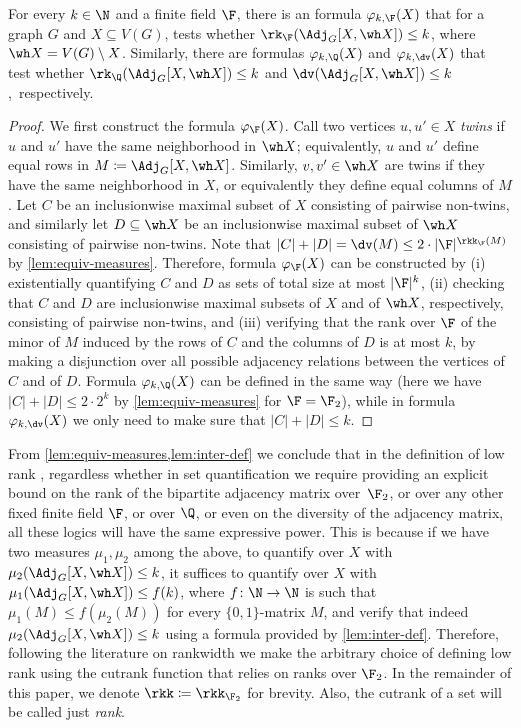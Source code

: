 \begin{lemma}\label{lem:inter-def}
 For every $k\in \N$ and a finite field $\F$, there is an \fo formula $\varphi_{k,\F}(X)$ that for a graph $G$ and $X\subseteq V(G)$, tests whether $\rk_\F(\Adj_G[X,\wh X])\leq k$, where $\wh X=V(G)\setminus X$. Similarly, there are formulas $\varphi_{k,\Q}(X)$ and $\varphi_{k,\dv}(X)$ that test whether $\rk_\Q(\Adj_G[X,\wh X])\leq k$ and $\dv(\Adj_G[X,\wh X])\leq k$,~respectively.
\end{lemma}
\begin{proof}
 We first construct the formula $\varphi_\F(X)$. Call two vertices $u,u'\in X$ {\em{twins}} if $u$ and $u'$ have the same neighborhood in $\wh X$; equivalently, $u$ and $u'$ define equal rows in $M\coloneqq \Adj_G[X,\wh X]$. Similarly, $v,v'\in \wh X$ are twins if they have the same neighborhood in $X$, or equivalently they define equal columns of $M$. Let $C$ be an inclusionwise maximal subset of $X$ consisting of pairwise non-twins, and similarly let $D\subseteq \wh X$ be an inclusionwise maximal subset of $\wh X$ consisting of pairwise non-twins. Note that $|C|+|D|=\dv(M)\leq 2 \cdot |\F|^{\rkk_\F(M)}$ by \cref{lem:equiv-measures}. Therefore, formula $\varphi_\F(X)$ can be constructed by (i) existentially quantifying $C$ and $D$ as sets of total size at most $|\F|^k$, (ii) checking that $C$ and $D$ are inclusionwise maximal subsets of $X$ and of $\wh X$, respectively, consisting of pairwise non-twins, and (iii) verifying that the rank over $\F$ of the minor of $M$ induced by the rows of $C$ and the columns of $D$ is at most $k$, by making a disjunction over all possible adjacency relations between the vertices of $C$ and of $D$. Formula $\varphi_{k,\Q}(X)$ can be defined in the same way (here we have $|C|+|D|\leq 2\cdot 2^k$ by \cref{lem:equiv-measures} for $\F=\F_2$), while in formula $\varphi_{k,\dv}(X)$ we only need to make sure that $|C|+|D|\leq k$.
\end{proof}

From \cref{lem:equiv-measures,lem:inter-def} we conclude that in the definition of low rank \mso, regardless whether in set quantification we require providing an explicit bound on the rank of the bipartite adjacency matrix over~$\F_2$, or over any other fixed finite field $\F$, or over $\Q$, or even on the diversity of the adjacency matrix, all these logics will have the same expressive power. This is because if we have two measures $\mu_1,\mu_2$ among the above, to quantify over $X$ with $\mu_2(\Adj_G[X,\wh X])\leq k$, it suffices to quantify over $X$ with $\mu_1(\Adj_G[X,\wh X])\leq f(k)$, where $f\colon \N\to \N$ is such that $\mu_1(M)\leq f(\mu_2(M))$ for every $\{0,1\}$-matrix $M$, and verify that indeed $\mu_2(\Adj_G[X,\wh X])\leq k$ using a formula provided by \cref{lem:inter-def}. Therefore, following the literature on rankwidth we make the arbitrary choice of defining low rank \mso using the cutrank function that relies on ranks over $\F_2$. In the remainder of this paper, we denote $\rkk\coloneqq \rkk_{\F_2}$ for brevity. Also, the cutrank of a set will be called just {\em{rank}}.


